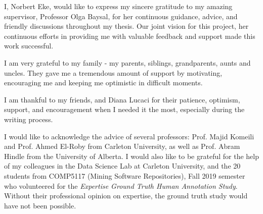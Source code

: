 I, Norbert Eke, would like to express my sincere gratitude to my amazing supervisor, Professor Olga Baysal, for her continuous guidance, advice, and friendly discussions throughout my thesis. Our joint vision for this project, her continuous efforts in providing me with valuable feedback and support made this work successful. 

I am very grateful to my family - my parents, siblings, grandparents, aunts and uncles. They gave me a tremendous amount of support by motivating, encouraging me and keeping me optimistic in difficult moments.

I am thankful to my friends, and Diana Lucaci for their patience, optimism, support, and encouragement when I needed it the most, especially during the writing process. 

I would like to acknowledge the advice of several professors: Prof. Majid Komeili and Prof. Ahmed El-Roby from Carleton University, as well as Prof. Abram Hindle from the University of Alberta. I would also like to be grateful for the help of my colleagues in the Data Science Lab at Carleton University, and the 20 students from COMP5117 (Mining Software Repositories), Fall 2019 semester who volunteered for the \emph{Expertise Ground Truth Human Annotation Study}. Without their professional opinion on expertise, the ground truth study would have not been possible.  
